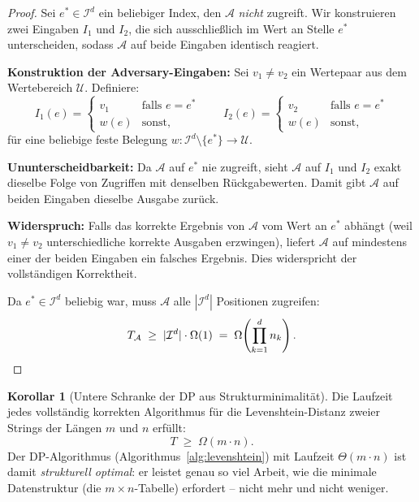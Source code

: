 ﻿\documentclass[a4paper,12pt]{article}
\theoremstyle{definition}
\newtheorem{korollar}{Korollar}
\begin{document}
\begin{proof}
    Sei $e^* \in \mathcal{I}^d$ ein beliebiger Index, den $\mathcal{A}$
    \emph{nicht} zugreift. Wir konstruieren zwei Eingaben $I_1$ und $I_2$,
    die sich ausschlie\ss{}lich im Wert an Stelle $e^*$ unterscheiden, sodass
    $\mathcal{A}$ auf beide Eingaben identisch reagiert.

    \textbf{Konstruktion der Adversary-Eingaben:}
    Sei $v_1 \neq v_2$ ein Wertepaar aus dem Wertebereich $\mathcal{U}$.
    Definiere:
    \[
        I_1(e) = \begin{cases} v_1 & \text{falls } e = e^* \\ w(e) & \text{sonst,} \end{cases}
        \qquad
        I_2(e) = \begin{cases} v_2 & \text{falls } e = e^* \\ w(e) & \text{sonst,} \end{cases}
    \]
    f\"{u}r eine beliebige feste Belegung $w: \mathcal{I}^d \setminus \{e^*\} \to \mathcal{U}$.

    \textbf{Ununterscheidbarkeit:} Da $\mathcal{A}$ auf $e^*$ nie zugreift,
    sieht $\mathcal{A}$ auf $I_1$ und $I_2$ exakt dieselbe Folge von Zugriffen
    mit denselben R\"{u}ckgabewerten. Damit gibt $\mathcal{A}$ auf beiden
    Eingaben dieselbe Ausgabe zur\"{u}ck.

    \textbf{Widerspruch:} Falls das korrekte Ergebnis von $\mathcal{A}$ vom
    Wert an $e^*$ abh\"{a}ngt (weil $v_1 \neq v_2$ unterschiedliche korrekte
    Ausgaben erzwingen), liefert $\mathcal{A}$ auf mindestens einer der
    beiden Eingaben ein falsches Ergebnis. Dies widerspricht der vollst\"{a}ndigen
    Korrektheit.

    Da $e^* \in \mathcal{I}^d$ beliebig war, muss $\mathcal{A}$ alle
    $|\mathcal{I}^d|$ Positionen zugreifen:
    \[
        T_{\mathcal{A}} \;\geq\; |\mathcal{I}^d| \cdot \Omega(1)
        \;=\; \Omega\!\left(\prod_{k=1}^d n_k\right). \qedhere
    \]
\end{proof}

\begin{korollar}[Untere Schranke der DP aus Strukturminimalit\"{a}t]
    \label{kor:dpunter}
    Die Laufzeit jedes vollst\"{a}ndig korrekten Algorithmus f\"{u}r die
    Levenshtein-Distanz zweier Strings der L\"{a}ngen $m$ und $n$ erf\"{u}llt:
    \[
        T \;\geq\; \Omega(m \cdot n).
    \]
    Der DP-Algorithmus (Algorithmus~\ref{alg:levenshtein}) mit Laufzeit
    $\Theta(m \cdot n)$ ist damit \emph{strukturell optimal}: er leistet
    genau so viel Arbeit, wie die minimale Datenstruktur (die $m \times n$-Tabelle)
    erfordert -- nicht mehr und nicht weniger.
\end{korollar}
\end{document}
